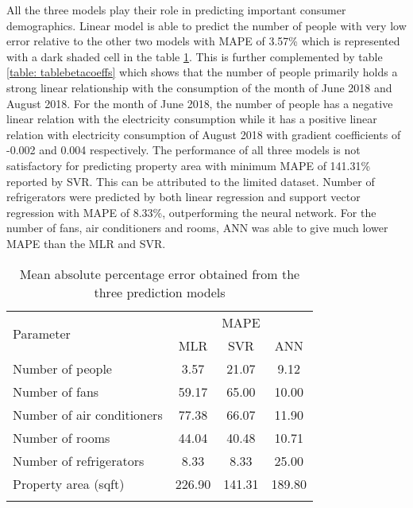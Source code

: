 \documentclass[conference]{IEEEtran}
\begin{document}
All the three models play their role in predicting important consumer demographics. Linear model is able to predict the number of people with very low error relative to the other two models with MAPE of 3.57\% which is represented with a dark shaded cell in the table \ref{table: tablemape}. This is further complemented by table \ref{table: tablebetacoeffs} which shows that the number of people primarily holds a strong linear relationship with the consumption of the month of June 2018 and August 2018. For the month of June 2018, the number of people has a negative linear relation with the electricity consumption while it has a positive linear relation with electricity consumption of August 2018 with gradient coefficients of -0.002 and 0.004 respectively. The performance of all three models is not satisfactory for predicting property area with minimum MAPE of 141.31\% reported by SVR. This can be attributed to the limited dataset. Number of refrigerators were predicted by both linear regression and support vector regression with MAPE of 8.33\%, outperforming the neural network. For the number of fans, air conditioners and rooms, ANN was able to give much lower MAPE than the MLR and SVR.




\begin{table}[ht]
\centering
\caption{Mean absolute percentage error obtained from the three prediction models}
\setlength{\tabcolsep}{2pt}
\begin{tabular}{lccc}
  \toprule 
  \multirow{2}{*}{Parameter} & \multicolumn{3}{c}{MAPE}\\
  \cmidrule(l){2-4}
   & MLR & SVR & ANN\\ 
  \midrule
  Number of people & \cellcolor{gray!70}3.57 & \cellcolor{gray!30}21.07 & \cellcolor{gray!50}9.12 \\ 
  Number of fans & \cellcolor{gray!10}59.17 & \cellcolor{gray!10}65.00 & \cellcolor{gray!50}10.00\\
  Number of air conditioners & \cellcolor{gray!10}77.38 & \cellcolor{gray!10}66.07 & \cellcolor{gray!50}11.90 \\ 
  Number of rooms & \cellcolor{gray!10}44.04 & \cellcolor{gray!10}40.48 & \cellcolor{gray!50}10.71 \\ 
  Number of refrigerators & \cellcolor{gray!50}8.33 & \cellcolor{gray!50}8.33 & \cellcolor{gray!30}25.00 \\ 
  Property area (sqft) & \cellcolor{gray!10}226.90 & \cellcolor{gray!10}141.31 & \cellcolor{gray!10}189.80 \\ 
  \bottomrule
  \label{table: tablemape}
\end{tabular}
\end{table}
\end{document}
